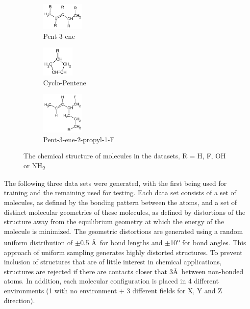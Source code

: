 \documentclass[twoside,11pt]{article}
\begin{document}
\begin{figure}[h!]
\centering
\begin{subfigure}{.3\textwidth}
  \centering
  \includegraphics[width=80px]{pent3ene.pdf}
  \caption{Pent-3-ene}
  \label{fig:pent3ene}
\end{subfigure}%
\begin{subfigure}{.3\textwidth}
  \centering
  \includegraphics[width=60px]{RcycloPenteneHs.pdf}
  \caption{Cyclo-Pentene}
  \label{fig:cycloPen}
\end{subfigure}
\begin{subfigure}{.3\textwidth}
  \centering
  \includegraphics[width=80px]{pent3ene2propNOF.pdf}
  \caption{Pent-3-ene-2-propyl-1-F}
  \label{fig:propSub}
\end{subfigure}
\caption{The chemical structure of molecules in the datasets, R = H, F, OH or NH\textsubscript{2}}
\label{fig:Molecules}
\end{figure}
The following three data sets were generated, with the first being used for training and the remaining used for testing. Each data set consists of a set of molecules, as defined by the bonding pattern between the atoms, and a set of distinct molecular geometries of these molecules, as defined by distortions of the structure away from the equilibrium geometry at which the energy of the molecule is minimized. The geometric distortions are generated using a random uniform distribution of $\pm$0.5 \AA\ for bond lengths and $\pm$10\textsuperscript{o} for bond angles.  This approach of uniform sampling generates highly distorted structures. To prevent inclusion of structures that are of little interest in chemical applications, structures are rejected if there are contacts closer that 3\AA\ between non-bonded atoms.  In addition, each molecular configuration is placed in 4 different environments (1 with no environment + 3 different fields for X, Y and Z direction).
\end{document}
